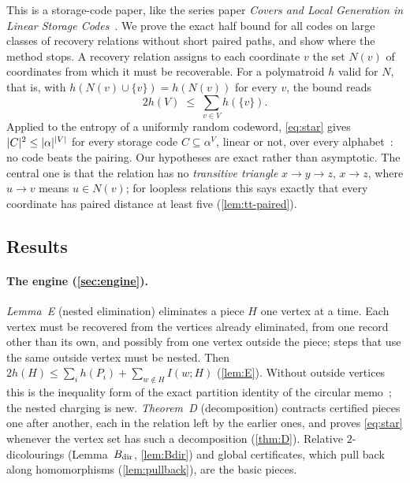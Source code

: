 This is a storage-code paper, like the series paper \emph{Covers and Local Generation in Linear Storage
Codes}~\cite{Covers2026}. We prove the exact half bound for all codes on large classes of recovery relations without short
paired paths, and show where the method stops. A recovery relation assigns to each coordinate $v$ the set $N(v)$ of
coordinates from which it must be recoverable. For a polymatroid $h$ valid for $N$, that is, with
$h(N(v)\cup\{v\})=h(N(v))$ for every $v$, the bound reads
\[
  2h(V)\;\le\;\sum_{v\in V}h(\{v\}).\tag{$\star$}
\]
Applied to the entropy of a uniformly random codeword, \eqref{eq:star} gives $\lvert C \rvert^2\le\lvert \alpha \rvert^{\lvert V \rvert}$ for
every storage code $C\subseteq\alpha^V$, linear or not, over every alphabet~\cite{FourthPaper2026}: no code beats the
pairing. Our hypotheses are exact rather than asymptotic. The central one is that the relation has no \emph{transitive
triangle} $x\to y\to z$, $x\to z$, where $u\to v$ means $u\in N(v)$; for loopless relations this says exactly that every
coordinate has paired distance at least five (\cref{lem:tt-paired}).

\subsection{Results}

\paragraph{The engine (\cref{sec:engine}).} \emph{Lemma~E} (nested elimination) eliminates a piece $H$ one vertex at a
time. Each vertex must be recovered from the vertices already eliminated, from one record other than its own, and possibly
from one vertex outside the piece; steps that use the same outside vertex must be nested. Then
$2h(H)\le\sum_ih(P_i)+\sum_{w\notin H}I(w;H)$ (\cref{lem:E}). Without outside vertices this is the inequality form of the
exact partition identity of the circular memo~\cite[Theorem~2.1]{CircularMemo2026}; the nested charging is new.
\emph{Theorem~D} (decomposition) contracts certified pieces one after another, each in the relation left by the earlier
ones, and proves \eqref{eq:star} whenever the vertex set has such a decomposition (\cref{thm:D}). Relative $2$-dicolourings
(Lemma~$B_{\mathrm{dir}}$, \cref{lem:Bdir}) and global certificates, which pull back along homomorphisms (\cref{lem:pullback}), are
the basic pieces.

